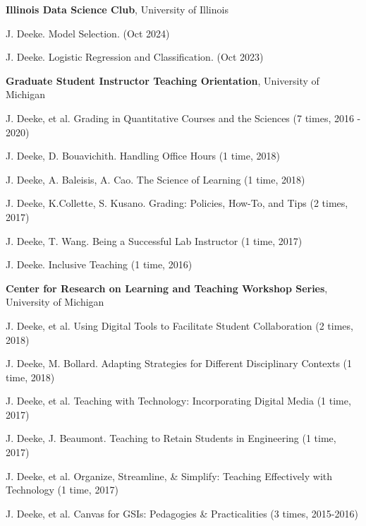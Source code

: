 \documentclass[10pt]{article}
\newenvironment{innerlist}[1][\enskip\textbullet]%
        {\begin{compactitem}[#1]}{\end{compactitem}}
\newcommand{\blankline}{\quad\pagebreak[2]}
\begin{document}
\textbf{Illinois Data Science Club}, University of Illinois
\begin{innerlist}
\item J. Deeke.  Model Selection.  (Oct 2024)
\item J. Deeke.  Logistic Regression and Classification.  (Oct 2023)
\end{innerlist}
\blankline

\textbf{Graduate Student Instructor Teaching Orientation}, University of Michigan
\begin{innerlist}
\item J. Deeke, et al.  Grading in Quantitative Courses and the Sciences (7 times, 2016 - 2020)
\item J. Deeke, D. Bouavichith.  Handling Office Hours (1 time, 2018)
\item J. Deeke, A. Baleisis, A. Cao.  The Science of Learning (1 time, 2018)
\item J. Deeke, K.Collette, S. Kusano.  Grading: Policies, How-To, and Tips (2 times, 2017)
\item J. Deeke, T. Wang.  Being a Successful Lab Instructor (1 time, 2017)
\item J. Deeke.  Inclusive Teaching (1 time, 2016)
\end{innerlist}
\blankline

\textbf{Center for Research on Learning and Teaching Workshop Series}, University of Michigan
\begin{innerlist}
\item J. Deeke, et al.  Using Digital Tools to Facilitate Student Collaboration (2 times, 2018)
\item J. Deeke, M. Bollard.  Adapting Strategies for Different Disciplinary Contexts (1 time, 2018)
\item J. Deeke, et al.  Teaching with Technology: Incorporating Digital Media (1 time, 2017)
\item J. Deeke, J. Beaumont.  Teaching to Retain Students in Engineering (1 time, 2017)
\item J. Deeke, et al.  Organize, Streamline, \& Simplify: Teaching Effectively with Technology (1 time, 2017)
\item J. Deeke, et al.  Canvas for GSIs: Pedagogies \& Practicalities (3 times, 2015-2016)
\end{innerlist}
\blankline
\end{document}
